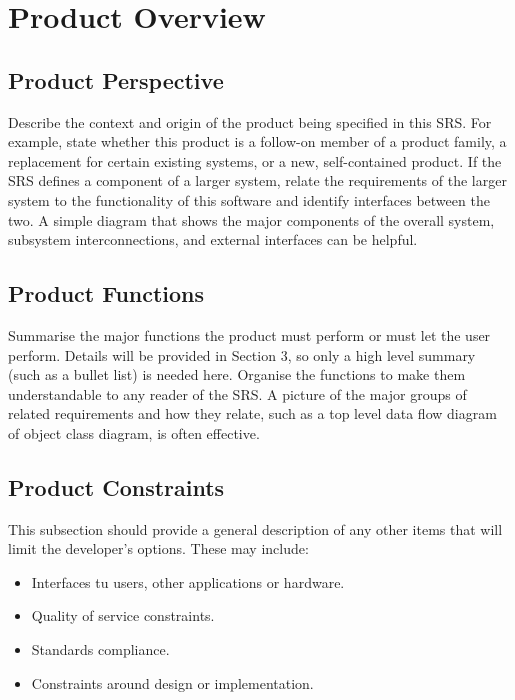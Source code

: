 \chapter{Product Overview}


\section{Product Perspective}

Describe the context and origin of the product being specified in this SRS. For
example, state whether this product is a follow-on member of a product family, a
replacement for certain existing systems, or a new, self-contained product. If
the SRS defines a component of a larger system, relate the requirements of the
larger system to the functionality of this software and identify interfaces
between the two. A simple diagram that shows the major components of the overall
system, subsystem interconnections, and external interfaces can be helpful.

\section{Product Functions}

Summarise the major functions the product must perform or must let the user
perform. Details will be provided in Section 3, so only a high level summary
(such as a bullet list) is needed here. Organise the functions to make them
understandable to any reader of the SRS. A picture of the major groups of
related requirements and how they relate, such as a top level data flow diagram
of object class diagram, is often effective.

\section{Product Constraints}

This subsection should provide a general description of any other items that
will limit the developer's options. These may include:

\begin{itemize}
	\item Interfaces tu users, other applications or hardware.
	\item Quality of service constraints.
	\item Standards compliance.
	\item Constraints around design or implementation.
\end{itemize}

